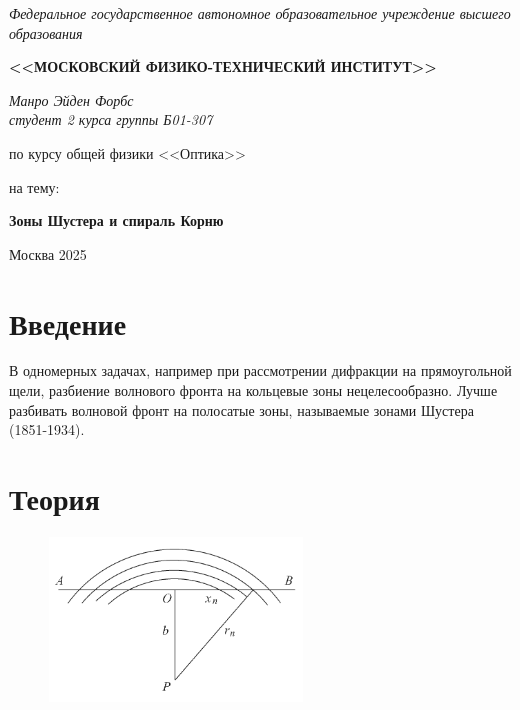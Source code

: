 \documentclass[a4paper,14pt]{article}
\begin{document}
\begin{titlepage}
    \pagestyle{empty}
\end{titlepage}
\linespread{1}

\thispagestyle{empty} 
\begin{center}
	\textit{Федеральное государственное автономное образовательное учреждение высшего образования }
	\vspace{0.5ex}
	
	\textbf{<<МОСКОВСКИЙ ФИЗИКО-ТЕХНИЧЕСКИЙ ИНСТИТУТ>>}
\end{center}
\vspace{13ex}
\begin{flushright}
	\noindent
	\textit{Манро Эйден Форбс}
	\\
	\textit{студент 2 курса группы Б01-307}
\end{flushright}
\begin{center}
	\vspace{13ex}
	\vspace{1ex}
	
	по курсу общей физики <<Оптика>>
	
	на тему:
	
	\textbf{Зоны Шустера и спираль Корню}
	
	\vfill
	Москва 2025
\end{center}

\newpage

\section{Введение}
В одномерных задачах, например при рассмотрении дифракции на прямоугольной щели, разбиение волнового фронта на кольцевые зоны нецелесообразно. Лучше разбивать волновой фронт на полосатые зоны, называемые зонами Шустера (1851-1934).

\section{Теория}

\begin{figure}
    \includegraphics[width = 0.6\textwidth]{govno.png}
    \caption{}\label{wrap-fig:govno}
\end{figure}
\end{document}
